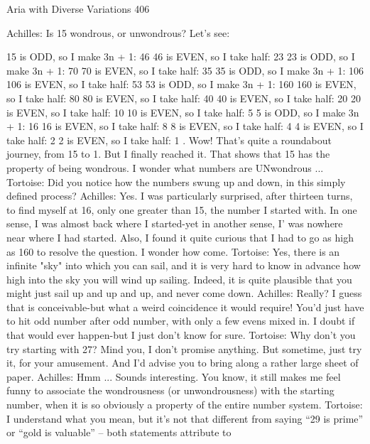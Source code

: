 Aria with Diverse Variations                                                              406

Achilles: Is 15 wondrous, or unwondrous? Let's see:

15 is ODD, so I make 3n + 1:                  46
46 is EVEN, so I take half:            23
23 is ODD, so I make 3n + 1:           70
70 is EVEN, so I take half:            35
35 is ODD, so I make 3n + 1:           106
106 is EVEN, so I take half:           53
53 is ODD, so I make 3n + 1:           160
160 is EVEN, so I take half:           80
80 is EVEN, so I take half:            40
40 is EVEN, so I take half:            20
20 is EVEN, so I take half:            10
10 is EVEN, so I take half:            5
5 is ODD, so I make 3n + 1:            16
16 is EVEN, so I take half:            8
8 is EVEN, so I take half:             4
4 is EVEN, so I take half:             2
2 is EVEN, so I take half:             1
.
    Wow! That's quite a roundabout journey, from 15 to 1. But I finally reached it. That
    shows that 15 has the property of being wondrous. I wonder what numbers are
    UNwondrous ...
Tortoise: Did you notice how the numbers swung up and down, in this simply defined
    process?
Achilles: Yes. I was particularly surprised, after thirteen turns, to find myself at 16, only
    one greater than 15, the number I started with. In one sense, I was almost back where
    I started-yet in another sense, I' was nowhere near where I had started. Also, I found
    it quite curious that I had to go as high as 160 to resolve the question. I wonder how
    come.
Tortoise: Yes, there is an infinite "sky" into which you can sail, and it is very hard to
    know in advance how high into the sky you will wind up sailing. Indeed, it is quite
    plausible that you might just sail up and up and up, and never come down.
Achilles: Really? I guess that is conceivable-but what a weird coincidence it would
    require! You'd just have to hit odd number after odd number, with only a few evens
    mixed in. I doubt if that would ever happen-but I just don't know for sure.
Tortoise: Why don't you try starting with 27? Mind you, I don't promise anything. But
    sometime, just try it, for your amusement. And I'd advise you to bring along a rather
    large sheet of paper.
Achilles: Hmm ... Sounds interesting. You know, it still makes me feel funny to associate
    the wondrousness (or unwondrousness) with the starting number, when it is so
    obviously a property of the entire number system.
Tortoise: I understand what you mean, but it's not that different from saying “29 is
    prime” or “gold is valuable” – both statements attribute to



